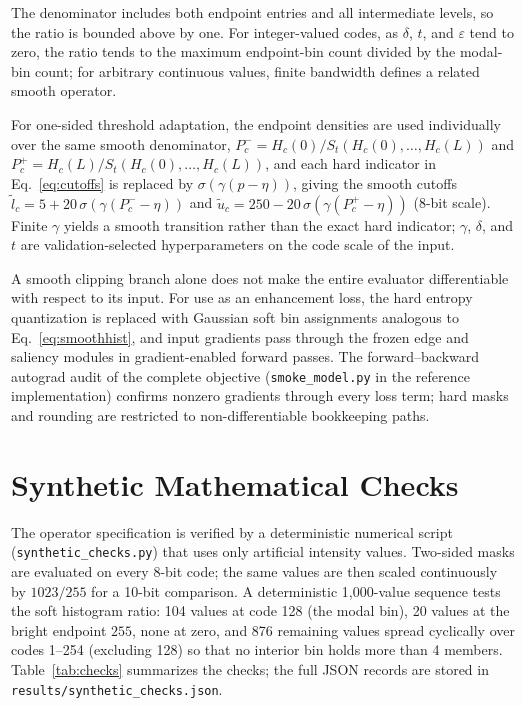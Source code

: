 \documentclass[5p,times,twocolumn]{elsarticle}
\begin{document}
The denominator includes both endpoint entries and all intermediate levels,
so the ratio is bounded above by one. For integer-valued codes, as $\delta$,
$t$, and $\varepsilon$ tend to zero, the ratio tends to the maximum
endpoint-bin count divided by the modal-bin count; for arbitrary continuous
values, finite bandwidth defines a related smooth operator.

For one-sided threshold adaptation, the endpoint densities are used
individually over the same smooth denominator,
$P_c^- = H_c(0)/S_t(H_c(0),\ldots,H_c(L))$ and
$P_c^+ = H_c(L)/S_t(H_c(0),\ldots,H_c(L))$, and each hard indicator in
Eq.~\eqref{eq:cutoffs} is replaced by $\sigma(\gamma(p - \eta))$, giving the
smooth cutoffs $\tilde{l}_c = 5 + 20\,\sigma(\gamma(P_c^- - \eta))$ and
$\tilde{u}_c = 250 - 20\,\sigma(\gamma(P_c^+ - \eta))$ (8-bit scale).
Finite $\gamma$ yields a smooth transition rather than the exact hard
indicator; $\gamma$, $\delta$, and $t$ are validation-selected
hyperparameters on the code scale of the input.

A smooth clipping branch alone does not make the entire evaluator
differentiable with respect to its input. For use as an enhancement loss, the
hard entropy quantization is replaced with Gaussian soft bin assignments
analogous to Eq.~\eqref{eq:smoothhist}, and input gradients pass through the
frozen edge and saliency modules in gradient-enabled forward passes. The
forward--backward autograd audit of the complete objective
(\texttt{smoke\_model.py} in the reference implementation) confirms nonzero
gradients through every loss term; hard masks and rounding are restricted to
non-differentiable bookkeeping paths.

\section{Synthetic Mathematical Checks}
\label{sec:checks}

The operator specification is verified by a deterministic numerical script
(\texttt{synthetic\_checks.py}) that uses only artificial intensity values.
Two-sided masks are evaluated on every 8-bit code; the same values are then
scaled continuously by $1023/255$ for a 10-bit comparison. A deterministic
1{,}000-value sequence tests the soft histogram ratio: 104 values at code 128
(the modal bin), 20 values at the bright endpoint $255$, none at zero, and
876 remaining values spread cyclically over codes 1--254 (excluding 128) so
that no interior bin holds more than 4 members. Table~\ref{tab:checks}
summarizes the checks; the full JSON records are stored in
\texttt{results/synthetic\_checks.json}.
\end{document}
